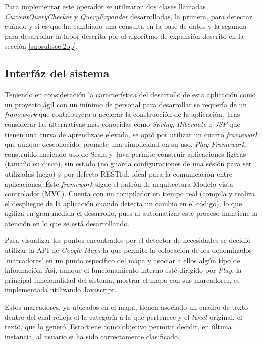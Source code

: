 Para implementar este operador se utilizaron dos clases llamadas \textit{CurrentQueryChecker} y \textit{QueryExpander} desarrolladas, la primera, para detectar cuándo y si es que ha cambiado una consulta en la base de datos y la segunda para desarrollar la labor descrita por el algoritmo de expansión descrito en la sección \ref{subsubsec:2op}.

\subsection{Interfáz del sistema}
\label{sec:diseno:interfaz}

Teniendo en consideración la característica del desarrollo de esta aplicación como un proyecto ágil con un mínimo de personal para desarrollar se requería de un \textit{framework} que contribuyera a acelerar la construcción de la aplicación. Tras considerar las alternativas más conocidas como \textit{Spring}, \textit{Hibernate} o \textit{JSF} que tienen una curva de aprendizaje elevada, se optó por utilizar un cuarto \textit{framework} que aunque desconocido, promete una simplicidad en su uso. \textit{Play Framework}, construido haciendo uso de Scala y Java permite construir aplicaciones ligeras (tamaño en disco), sin estado (no guarda configuraciones de una sesión para ser utilizadas luego) y por defecto RESTful, ideal para la comunicación entre aplicaciones. Éste \textit{framework} sigue el patrón de arquitectura Modelo-vista-controlador (MVC). Cuenta con un compilador en tiempo real (compila y realiza el despliegue de la aplicación cuando detecta un cambio en el código), lo que agiliza en gran medida el desarrollo, pues al automatizar este proceso mantiene la atención en lo que se está desarrollando.

Para visualizar los puntos encontrados por el detector de necesidades se decidió utilizar la API de \textit{Google Maps} la que permite la colocación de los denominados 'marcadores' en un punto específico del mapa y asociar a ellos algún tipo de información. Así, aunque el funcionamiento interno esté dirigido por \textit{Play}, la principal funcionalidad del sistema, mostrar el mapa con sus marcadores, es implementada utilizando Javascript.

Estos marcadores, ya ubicados en el mapa, tienen asociado un cuadro de texto dentro del cual refleja el la categoría a la que pertenece y el \textit{tweet} original, el texto, que lo generó. Esto tiene como objetivo permitir decidir, en última instancia, al usuario si ha sido correctamente clasificado.


